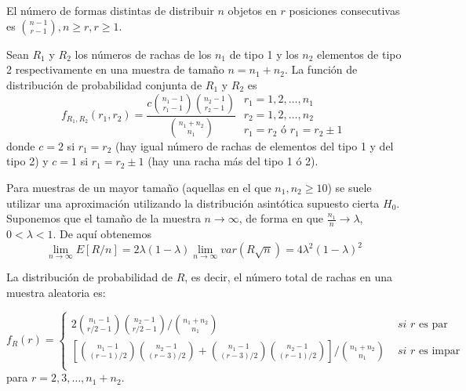 \begin{lema} 
	El número de formas distintas de distribuir $n$ objetos en $r$ posiciones consecutivas es ${n-1 \choose r-1}, n \geq r, r \geq 1$.
\end{lema}

\begin{teorema}
	Sean $R_1$ y $R_2$ los números de rachas de los $n_1$ de tipo 1 y los $n_2$ elementos de tipo 2 respectivamente en una muestra de tamaño $n = n_1 + n_2$. La función de distribución de probabilidad conjunta de $R_1$ y $R_2$ es
	\[ f_{R_1,R_2} (r_1, r_2) = 
		\frac{c {n_1 - 1 \choose r_1 - 1} 
				{n_2 - 1 \choose r_2 - 1}}
			{{n_1 + n_2 \choose n_1}}\;
		\begin{array}{l}
			r_1 = 1,2, \dots, n_1 \\
			r_2 = 1,2, \dots, n_2 \\
			r_1 = r_2 \text{ ó } r_1 = r_2 \pm 1
		\end{array}
	\]
	donde $c=2$ si $r_1 = r_2$ (hay igual número de rachas de elementos del tipo 1 y del tipo 2) y $c=1$ si $r_1 = r_2 \pm 1$ (hay una racha más del tipo 1 ó 2).
\end{teorema}

	Para muestras de un mayor tamaño (aquellas en el que $n_1, n_2 \geq 10$) se suele utilizar una aproximación utilizando la distribución asintótica supuesto cierta $H_0$.\\
	Suponemos que el tamaño de la muestra $n \rightarrow \infty$, de forma en que $\frac{n_1}{n} \rightarrow \lambda$, $0<\lambda<1$. De aquí obtenemos
	\[ \underset{n \rightarrow \infty}{\lim} E[R/n] = 
			2\lambda (1-\lambda) 
				\underset{n \rightarrow \infty}{\lim} 
					var(R\sqrt{n}) =
			4\lambda^2(1-\lambda)^2
	\]
	
\begin{teorema}
	La distribución de probabilidad de $R$, es decir, el número total de rachas en una muestra aleatoria es:
	
	\begin{equation}
		f_R(r) = \left\lbrace\begin{array}{ll}
	2 {n_1-1 \choose r/2-1} {n_2-1 \choose r/2-1} 
		\big/ {n_1 + n_2 \choose n_1} &
			\textit{ si } r \text{ es par} \\
	\left[
		{n_1-1 \choose (r-1)/2} {n_2-1 \choose (r-3)/2} +  
		{n_1-1 \choose (r-3)/2} {n_2-1 \choose (r-1)/2} 
	\right]
		\big/ {n_1 + n_2 \choose n_1} &
			\textit{ si } r \text{ es impar} \\		
		\end{array}\right.
	\label{th-dist-R}
	\end{equation}
	para $r=2, 3, \dots, n_1 + n_2.$
\end{teorema}
	
